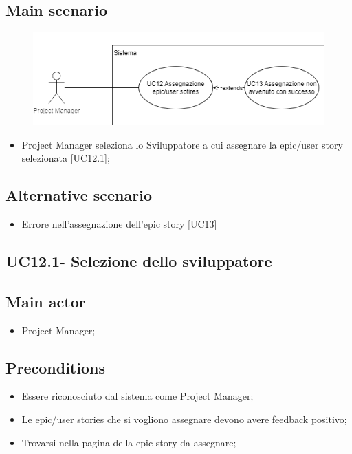 \documentclass{article}
\begin{document}
    \subsection*{Main scenario}
        \begin{figure}[h]
          \centering
          \includegraphics{./imgUML/UC12-zoom.png}
          \label{fig:immagine}
        \end{figure}
        
        \begin{itemize}
            \item Project Manager seleziona lo Sviluppatore a cui assegnare la epic/user story selezionata [UC12.1];
        \end{itemize}
        
    \subsection*{Alternative scenario}
        \begin{itemize}
            \item Errore nell'assegnazione dell'epic story [UC13]
        \end{itemize}    
        
    \subsection{UC12.1- Selezione dello sviluppatore}
        \subsection*{Main actor}
    \begin{itemize}
        \item Project Manager;
    \end{itemize}
    
    \subsection*{Preconditions}
        \begin{itemize}
            \item Essere riconosciuto dal sistema come Project Manager;
            \item Le epic/user stories che si vogliono assegnare devono avere feedback positivo;
            \item Trovarsi nella pagina della epic story da assegnare;
        \end{itemize}
        
\end{document}
